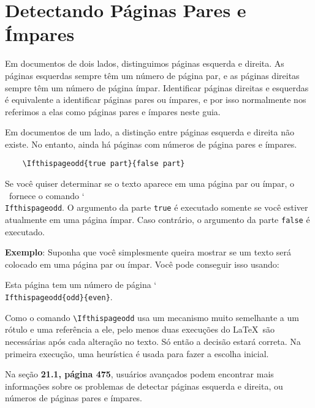 \chapter{Detectando Páginas Pares e Ímpares}
Em documentos de dois lados, distinguimos páginas esquerda e direita. As páginas esquerdas sempre têm um número de página par, e as páginas direitas sempre têm um número de página ímpar. Identificar páginas direitas e esquerdas é equivalente a identificar páginas pares ou ímpares, e por isso normalmente nos referimos a elas como páginas pares e ímpares neste guia.

Em documentos de um lado, a distinção entre páginas esquerda e direita não existe. No entanto, ainda há páginas com números de página pares e ímpares.
\begin{verbatim}
    \Ifthispageodd{true part}{false part}
\end{verbatim}

Se você quiser determinar se o texto aparece em uma página par ou ímpar, o \KOMAScript\ fornece o comando \char`\\\texttt{If\-this\-page\-odd}. O argumento da parte \texttt{true} é executado somente se você estiver atualmente em uma página ímpar. Caso contrário, o argumento da parte \texttt{false} é executado.

\textbf{Exemplo}: Suponha que você simplesmente queira mostrar se um texto será colocado em uma página par ou ímpar. Você pode conseguir isso usando:

Esta página tem um número de página \char`\\\texttt{If\-this\-page\-odd\{odd\}\{even\}}.

Como o comando \verb|\Ifthispageodd| usa um mecanismo muito semelhante a um rótulo e uma referência a ele, pelo menos duas execuções do \LaTeX\ são necessárias após cada alteração no texto. Só então a decisão estará correta. Na primeira execução, uma heurística é usada para fazer a escolha inicial.

Na seção \textbf{21.1, página 475}, usuários avançados podem encontrar mais informações sobre os problemas de detectar páginas esquerda e direita, ou números de páginas pares e ímpares.
